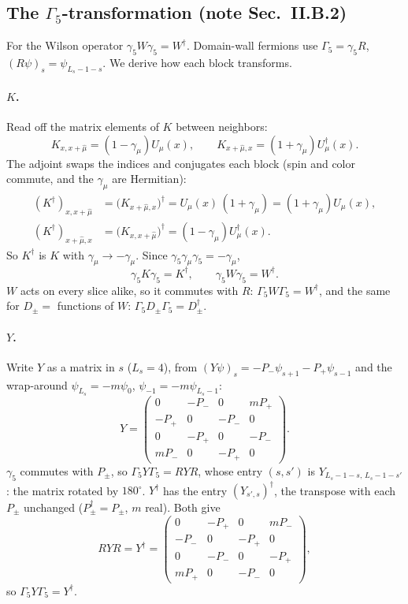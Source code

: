 \documentclass[11pt,a4paper]{article}
\numberwithin{equation}{section}
\newcommand{\dg}{^{\dagger}}
\newcommand{\Pp}{P_{+}}
\newcommand{\Pm}{P_{-}}
\newcommand{\Gfive}{\Gamma_5}
\begin{document}
\subsection{The $\Gfive$-transformation (note Sec.~II.B.2)}
\label{sec:g5}
For the Wilson operator $\gamma_5W\gamma_5=W\dg$. Domain-wall fermions use
$\Gfive=\gamma_5R$, $(R\psi)_s=\psi_{L_s-1-s}$. We derive how each block transforms.

\paragraph{$K$.} Read off the matrix elements of $K$ between neighbors:
\begin{equation}
K_{x,x+\hat\mu}=(1-\gamma_\mu)U_\mu(x),\qquad K_{x+\hat\mu,x}=(1+\gamma_\mu)U_\mu\dg(x).
\end{equation}
The adjoint swaps the indices and conjugates each block (spin and color commute, and the
$\gamma_\mu$ are Hermitian):
\begin{align}
(K\dg)_{x,x+\hat\mu}&=\big(K_{x+\hat\mu,x}\big)\dg=U_\mu(x)\,(1+\gamma_\mu)=(1+\gamma_\mu)U_\mu(x),\nonumber\\
(K\dg)_{x+\hat\mu,x}&=\big(K_{x,x+\hat\mu}\big)\dg=(1-\gamma_\mu)U_\mu\dg(x).
\end{align}
So $K\dg$ is $K$ with $\gamma_\mu\to-\gamma_\mu$. Since $\gamma_5\gamma_\mu\gamma_5=-\gamma_\mu$,
\begin{equation}
\gamma_5K\gamma_5=K\dg,\qquad \gamma_5W\gamma_5=W\dg .
\end{equation}
$W$ acts on every slice alike, so it commutes with $R$: $\Gfive W\Gfive=W\dg$, and the same for
$D_\pm=$ functions of $W$: $\Gfive D_\pm\Gfive=D_\pm\dg$.

\paragraph{$Y$.} Write $Y$ as a matrix in $s$ ($L_s=4$), from $(Y\psi)_s=-\Pm\psi_{s+1}-\Pp\psi_{s-1}$
and the wrap-around $\psi_{L_s}=-m\psi_0$, $\psi_{-1}=-m\psi_{L_s-1}$:
\begin{equation}
Y=\begin{pmatrix}0&-\Pm&0&m\Pp\\-\Pp&0&-\Pm&0\\0&-\Pp&0&-\Pm\\m\Pm&0&-\Pp&0\end{pmatrix}.
\end{equation}
$\gamma_5$ commutes with $P_\pm$, so $\Gfive Y\Gfive=RYR$, whose entry $(s,s')$ is
$Y_{L_s-1-s,\,L_s-1-s'}$: the matrix rotated by $180^\circ$. $Y\dg$ has the entry
$(Y_{s',s})\dg$, the transpose with each $P_\pm$ unchanged ($P_\pm\dg=P_\pm$, $m$ real). Both give
\begin{equation}
RYR=Y\dg=\begin{pmatrix}0&-\Pp&0&m\Pm\\-\Pm&0&-\Pp&0\\0&-\Pm&0&-\Pp\\m\Pp&0&-\Pm&0\end{pmatrix},
\end{equation}
so $\Gfive Y\Gfive=Y\dg$.
\end{document}
